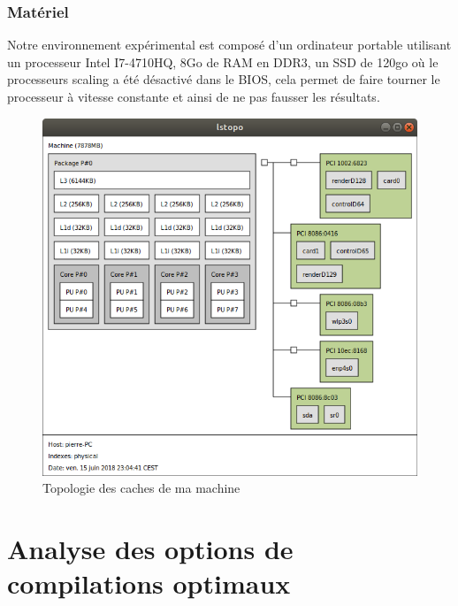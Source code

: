 \documentclass[
 aip,
 jmp,
 amsmath,amssymb,
 reprint
]{revtex4-1}
\begin{document}
\subsubsection{Matériel}
Notre environnement expérimental est composé d'un ordinateur portable utilisant un processeur Intel I7-4710HQ, 8Go de RAM en DDR3, un SSD de 120go où le processeurs scaling a été désactivé dans le BIOS, cela permet de faire tourner le processeur à vitesse constante et ainsi de ne pas fausser les résultats.

\begin{figure}[H]
  \includegraphics[width=\linewidth, keepaspectratio=true]{caches.png}
  \caption{Topologie des caches de ma machine\label{Fig:caches}}
\end{figure}

\section{Analyse des options de compilations optimaux}
\end{document}
